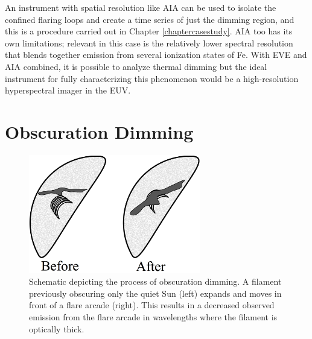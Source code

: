 An instrument with spatial resolution like AIA can be used to isolate the confined flaring loops and create a time series of just the dimming region, and this is a procedure carried out in Chapter \ref{chaptercasestudy}. AIA too has its own limitations; relevant in this case is the relatively lower spectral resolution that blends together emission from several ionization states of Fe. With EVE and AIA combined, it is possible to analyze thermal dimming but the ideal instrument for fully characterizing this phenomenon would be a high-resolution hyperspectral imager in the EUV.

\section{Obscuration Dimming}

\begin{figure}[!h]
    \caption[Schematic of obscuration dimming]{
        Schematic depicting the process of obscuration dimming. A filament previously obscuring only the quiet Sun (left)
        expands and moves in front of a flare arcade (right). This results in a decreased observed emission from the flare
        arcade in wavelengths where the filament is optically thick.
    }
    \begin{center}
        \includegraphics[width=75mm]{Images/ObscurationDimming.png}
    \end{center}
    \label{obscurationDimming}
\end{figure}


